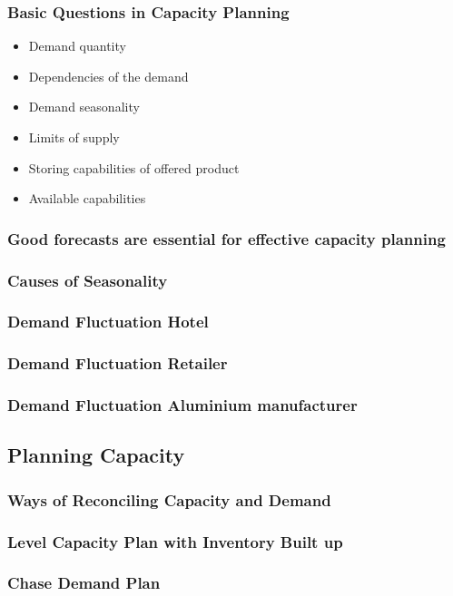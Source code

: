 \subsubsection{Basic Questions in Capacity Planning}
\begin{itemize}
	\item Demand quantity
	\item Dependencies of the demand
	\item Demand seasonality 
	\item Limits of supply 
	\item Storing capabilities of offered product 
	\item Available capabilities
\end{itemize}
\subsubsection{Good forecasts are essential for effective capacity planning}
\subsubsection{Causes of Seasonality}
\subsubsection{Demand Fluctuation Hotel}
\subsubsection{Demand Fluctuation Retailer}
\subsubsection{Demand Fluctuation Aluminium manufacturer}
\subsection{Planning Capacity}
\subsubsection{Ways of Reconciling Capacity and Demand}
\subsubsection{Level Capacity Plan with Inventory Built up}
\subsubsection{Chase Demand Plan}
